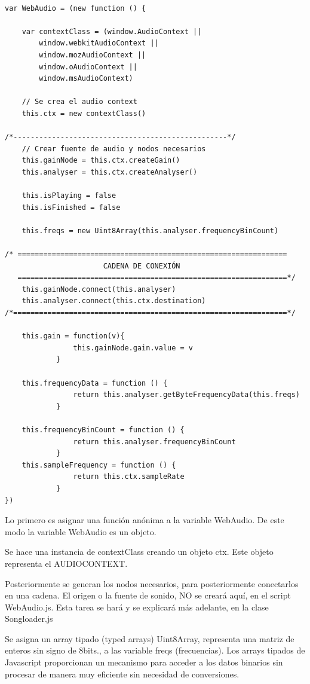 \begin{verbatim}
 
var WebAudio = (new function () {
    
    var contextClass = (window.AudioContext ||
        window.webkitAudioContext ||
        window.mozAudioContext ||
        window.oAudioContext ||
        window.msAudioContext)
    
    // Se crea el audio context
    this.ctx = new contextClass()
    
/*--------------------------------------------------*/
    // Crear fuente de audio y nodos necesarios
    this.gainNode = this.ctx.createGain()
    this.analyser = this.ctx.createAnalyser()
      
    this.isPlaying = false
    this.isFinished = false
    
    this.freqs = new Uint8Array(this.analyser.frequencyBinCount)
    
/* ===============================================================
                       CADENA DE CONEXIÓN
   ===============================================================*/
    this.gainNode.connect(this.analyser)
    this.analyser.connect(this.ctx.destination)
/*================================================================*/    

    this.gain = function(v){
			    this.gainNode.gain.value = v
            }	
	
    this.frequencyData = function () {
                return this.analyser.getByteFrequencyData(this.freqs)
            }
       
    this.frequencyBinCount = function () {
                return this.analyser.frequencyBinCount
            }
	this.sampleFrequency = function () {
                return this.ctx.sampleRate
            }
})
\end{verbatim}

Lo primero es asignar una función anónima a la variable WebAudio. De este modo la variable WebAudio es un objeto. 

Se hace una instancia de contextClass creando un objeto ctx. Este objeto representa el AUDIOCONTEXT.

Posteriormente se generan los nodos necesarios, para posteriormente conectarlos en una cadena. El origen o la fuente de sonido, NO se creará aquí, en el script WebAudio.js. Esta tarea se hará y se explicará más adelante, en la clase Songloader.js

Se asigna un  array tipado (typed arrays) Uint8Array, representa una matriz de enteros sin signo de 8bits., a las variable freqs (frecuencias). Los arrays tipados de Javascript proporcionan un mecanismo para acceder a los datos binarios sin procesar de manera muy eficiente sin necesidad de conversiones.

